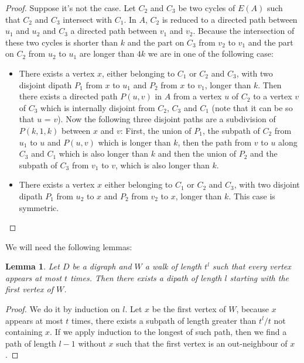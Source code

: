 \documentclass[utf8,10pt]{article}
\theoremstyle{plain}
\newtheorem{lemma}[theorem]{Lemma}
\theoremstyle{definition}
\theoremstyle{remark}
\begin{document}
\begin{proof}

Suppose it's not the case. Let $C_2$ and $C_3$ be two cycles of $E(A)$ such that $C_2$ and $C_3$ intersect with $C_1$.
In $A$, $C_2$ is reduced to a directed path between $u_1$ and $u_2$ and $C_3$ a directed path between $v_1$ and $v_2$.
Because the intersection of these two cycles is shorter than $k$ and the part on $C_3$ from $v_2$ to $v_1$ and the part
on $C_2$ from $u_2$ to $u_1$ are longer than $4k$ we are in one of the following case:
\begin{itemize}
	\item There exists a vertex $x$, either belonging to $C_1$ or $C_2$ and $C_3$, with two disjoint dipath $P_1$ from
	$x$ to $u_1$ and $P_2$ from $x$ to $v_1$, longer than $k$. Then there exists a directed path $P(u,v)$ in $A$ from
	a vertex $u$ of $C_2$ to a vertex $v$ of $C_3$ which is internally disjoint from  $C_2$, $C_3$ and $C_1$
	(note that it can be so that $u$ = $v$). Now the following three disjoint paths are a subdivision of $P(k,1,k)$ between $x$ and $v$:
	First, the union of $P_1$, the subpath of $C_2$ from $u_1$ to $u$ and $P(u,v)$ which is longer than $k$, then the path from $v$ to $u$
	along $C_3$ and $C_1$ which is also longer than $k$ and then the union of $P_2$ and the subpath of $C_3$ from $v_1$ to $v$, which is also longer than $k$.
	\item There exists a vertex $x$ either belonging to $C_1$ or $C_2$ and $C_3$, with two disjoint dipath $P_1$ from
	$u_2$ to $x$ and $P_2$ from $v_2$ to $x$, longer than $k$. This case is symmetric.
\end{itemize}

\end{proof}


We will need the following lemmas:

\begin{lemma}\label{walk}
Let $D$ be a digraph and $W$ a walk of length $t^l$ such that every vertex appears at most $t$ times.
Then there exists a dipath of length $l$ starting with the first vertex of $W$.
\end{lemma}

\begin{proof}
We do it by induction on $l$. Let $x$ be the first vertex of $W$, because $x$ appears at most $t$ times, there exists a subpath of length greater
than $t^l/t$ not containing $x$. If we apply induction to the longest of such path, then we find a path of length $l-1$ without $x$ such that
 the first vertex is an out-neighbour of $x$.

\end{proof}
\end{document}
